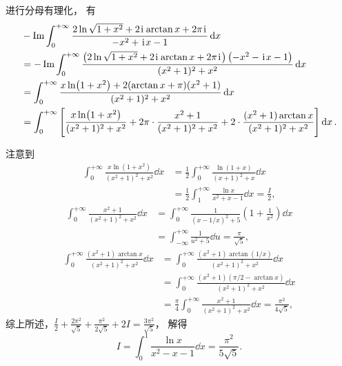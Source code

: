 \begin{example}
\begin{solution}
进行分母有理化，
有\begin{align*}
	&-\Im \int_0^{+\infty} \frac{2\ln\sqrt{1+x^2} + 2\kern1pt\mathrm{i}\kern1pt \arctan x + 2\pi\kern1pt\mathrm{i}\kern1pt}{-x^2+\kern1pt\mathrm{i}\kern1pt x-1} \dd{x} \\
	&= -\Im \int_0^{+\infty} \frac{\left(2\ln\sqrt{1+x^2} + 2\kern1pt\mathrm{i}\kern1pt \arctan x + 2\pi\kern1pt\mathrm{i}\kern1pt\right) \left(-x^2-\kern1pt\mathrm{i}\kern1pt x-1\right)}{(x^2+1)^2+x^2} \dd{x} \\
	&= \int_0^{+\infty} \frac{x \ln(1+x^2) + 2(\arctan x + \pi) (x^2+1)}{(x^2+1)^2+x^2} \dd{x} \\
	&= \int_0^{+\infty} \left[
	\frac{x \ln(1+x^2)}{(x^2+1)^2+x^2}
	+ 2\pi \cdot \frac{x^2+1}{(x^2+1)^2+x^2}
	+ 2 \cdot \frac{(x^2+1) \arctan x}{(x^2+1)^2+x^2}
	\right] \dd{x}.
\end{align*}

注意到\begin{align*}
	\int_0^{+\infty} \frac{x \ln(1+x^2)}{(x^2+1)^2+x^2} \dd{x}
	&= \frac{1}{2} \int_0^{+\infty} \frac{\ln(1+x)}{(x+1)^2+x} \dd{x} \\
	&= \frac{1}{2} \int_1^{+\infty} \frac{\ln x}{x^2+x-1} \dd{x}
	= \frac{I}{2},
\end{align*}
\begin{align*}
	\int_0^{+\infty} \frac{x^2+1}{(x^2+1)^2+x^2} \dd{x}
	&= \int_0^{+\infty} \frac{1}{\left(x-1/x\right)^2+5} \left(1+\frac{1}{x^2}\right) \dd{x} \\
	&= \int_{-\infty}^{+\infty} \frac{1}{u^2+5} \dd{u}
	= \frac{\pi}{\sqrt{5}},
\end{align*}
\begin{align*}
	\int_0^{+\infty} \frac{(x^2+1) \arctan x}{(x^2+1)^2+x^2} \dd{x}
	&= \int_0^{+\infty} \frac{(x^2+1) \arctan(1/x)}{(x^2+1)^2+x^2} \dd{x} \\
	&= \int_0^{+\infty} \frac{(x^2+1) (\pi/2 - \arctan x)}{(x^2+1)^2+x^2} \dd{x} \\
	&= \frac{\pi}{4} \int_0^{+\infty} \frac{x^2+1}{(x^2+1)^2+x^2} \dd{x}
	= \frac{\pi^2}{4\sqrt{5}},
\end{align*}
综上所述，\(\frac{I}{2} + \frac{2\pi^2}{\sqrt{5}} + \frac{\pi^2}{2\sqrt{5}} + 2I
= \frac{3\pi^2}{\sqrt{5}}\)，
解得\[
	I = \int_0^1 \frac{\ln x}{x^2-x-1} \dd{x}
	= \frac{\pi^2}{5\sqrt{5}}.
\]
\end{solution}
\end{example}
